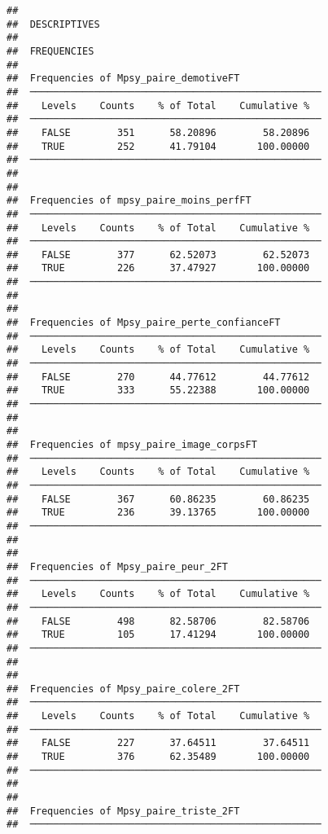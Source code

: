 \documentclass[
]{article}
\begin{document}
\begin{verbatim}
## 
##  DESCRIPTIVES
## 
##  FREQUENCIES
## 
##  Frequencies of Mpsy_paire_demotiveFT               
##  ────────────────────────────────────────────────── 
##    Levels    Counts    % of Total    Cumulative %   
##  ────────────────────────────────────────────────── 
##    FALSE        351      58.20896        58.20896   
##    TRUE         252      41.79104       100.00000   
##  ────────────────────────────────────────────────── 
## 
## 
##  Frequencies of mpsy_paire_moins_perfFT             
##  ────────────────────────────────────────────────── 
##    Levels    Counts    % of Total    Cumulative %   
##  ────────────────────────────────────────────────── 
##    FALSE        377      62.52073        62.52073   
##    TRUE         226      37.47927       100.00000   
##  ────────────────────────────────────────────────── 
## 
## 
##  Frequencies of Mpsy_paire_perte_confianceFT        
##  ────────────────────────────────────────────────── 
##    Levels    Counts    % of Total    Cumulative %   
##  ────────────────────────────────────────────────── 
##    FALSE        270      44.77612        44.77612   
##    TRUE         333      55.22388       100.00000   
##  ────────────────────────────────────────────────── 
## 
## 
##  Frequencies of mpsy_paire_image_corpsFT            
##  ────────────────────────────────────────────────── 
##    Levels    Counts    % of Total    Cumulative %   
##  ────────────────────────────────────────────────── 
##    FALSE        367      60.86235        60.86235   
##    TRUE         236      39.13765       100.00000   
##  ────────────────────────────────────────────────── 
## 
## 
##  Frequencies of Mpsy_paire_peur_2FT                 
##  ────────────────────────────────────────────────── 
##    Levels    Counts    % of Total    Cumulative %   
##  ────────────────────────────────────────────────── 
##    FALSE        498      82.58706        82.58706   
##    TRUE         105      17.41294       100.00000   
##  ────────────────────────────────────────────────── 
## 
## 
##  Frequencies of Mpsy_paire_colere_2FT               
##  ────────────────────────────────────────────────── 
##    Levels    Counts    % of Total    Cumulative %   
##  ────────────────────────────────────────────────── 
##    FALSE        227      37.64511        37.64511   
##    TRUE         376      62.35489       100.00000   
##  ────────────────────────────────────────────────── 
## 
## 
##  Frequencies of Mpsy_paire_triste_2FT               
##  ────────────────────────────────────────────────── 

\end{verbatim}
\end{document}
